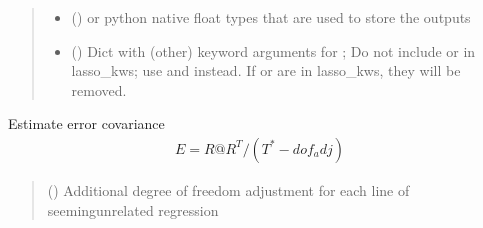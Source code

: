 \documentclass[letterpaper,10pt,english]{sphinxmanual}
\begin{document}
\begin{fulllineitems}
\begin{quote}
\begin{description}
\begin{itemize}
\item {}
\sphinxAtStartPar
{} () \textendash{}  or python native float types that are used
to store the outputs

\item {}
\sphinxAtStartPar
{} () \textendash{} Dict with (other) keyword arguments for ;
Do not include  or  in lasso\_kws; use
 and  instead. If  or  are
in lasso\_kws, they will be removed.

\end{itemize}

\end{description}\end{quote}

\begin{fulllineitems}
\label{\detokenize{kalman:glomar_gridding.autocorrelation.LassoEstimate_AR1.estimate_errcov}}
\pysigstartsignatures
\pysiglinewithargsret
{}
{}
{}
\pysigstopsignatures
\sphinxAtStartPar
Estimate error covariance
\begin{equation*}
\begin{split}E = R @ R^{T} / (T^{*} - dof_adj)\end{split}
\end{equation*}\begin{quote}\begin{description}
\sphinxAtStartPar
{} () \textendash{} Additional degree of freedom adjustment
for each line of seeming\sphinxhyphen{}unrelated regression

\end{description}\end{quote}


\end{fulllineitems}
\end{fulllineitems}
\end{document}
